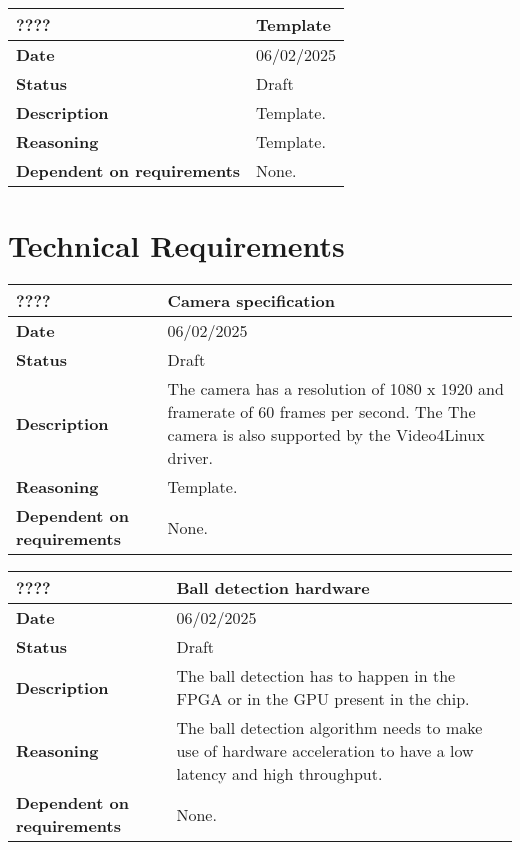 \documentclass{article}
\begin{document}
\begin{table}[H]
    \renewcommand{\arraystretch}{1.3}
    \begin{tabular}{|l|p{10cm}|}
        \hline
        \rowcolor{gray!50}
        \textbf{????} & \textbf{Template} \\ \hline
        \textbf{Date} & 06/02/2025 \\ \hline
        \textbf{Status} & Draft \\ \hline
        \textbf{Description} & Template. \\ \hline
        \textbf{Reasoning} & Template. \\ \hline
        \textbf{Dependent on requirements} & None. \\ \hline
    \end{tabular}
\end{table}

\newpage

\section{Technical Requirements}

\begin{table}[H]
    \renewcommand{\arraystretch}{1.3}
    \begin{tabular}{|l|p{10cm}|}
        \hline
        \rowcolor{gray!50}
        \textbf{????} & \textbf{Camera specification} \\ \hline
        \textbf{Date} & 06/02/2025 \\ \hline
        \textbf{Status} & Draft \\ \hline
        \textbf{Description} & The camera has a resolution of 1080 x 1920 and framerate of 60 frames per second. The 
        The camera is also supported by the Video4Linux \cite{Video4Linux} driver.\\ \hline

        \textbf{Reasoning} & Template. \\ \hline
        \textbf{Dependent on requirements} & None. \\ \hline
    \end{tabular}
\end{table}

\begin{table}[H]
    \renewcommand{\arraystretch}{1.3}
    \begin{tabular}{|l|p{10cm}|}
        \hline
        \rowcolor{gray!50}
        \textbf{????} & \textbf{Ball detection hardware} \\ \hline
        \textbf{Date} & 06/02/2025 \\ \hline
        \textbf{Status} & Draft \\ \hline
        \textbf{Description} & The ball detection has to happen in the FPGA or in the GPU present in the chip. \\ \hline
        \textbf{Reasoning} & The ball detection algorithm needs to make use of hardware acceleration to have a low latency and high throughput. \\ \hline
        \textbf{Dependent on requirements} & None. \\ \hline
    \end{tabular}
\end{table}
\end{document}
